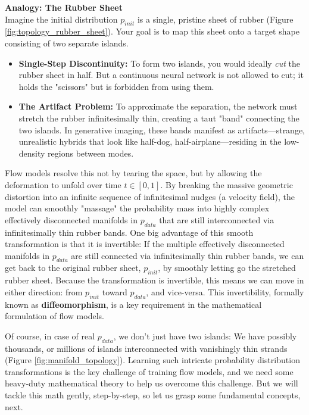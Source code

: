 \documentclass{book}
\begin{document}
\textbf{Analogy: The Rubber Sheet} \\
Imagine the initial distribution $p_{init}$ is a single, pristine sheet of rubber (Figure \ref{fig:topology_rubber_sheet}). Your goal is to map this sheet onto a target shape consisting of two separate islands.
\begin{itemize}
    \item \textbf{Single-Step Discontinuity:} To form two islands, you would ideally \textit{cut} the rubber sheet in half. But a continuous neural network is not allowed to cut; it holds the "scissors" but is forbidden from using them.
    \item \textbf{The Artifact Problem:} To approximate the separation, the network must stretch the rubber infinitesimally thin, creating a taut "band" connecting the two islands. In generative imaging, these bands manifest as artifacts—strange, unrealistic hybrids that look like half-dog, half-airplane—residing in the low-density regions between modes.
\end{itemize}

Flow models resolve this not by tearing the space, but by allowing the deformation to unfold over time $t \in [0, 1]$. By breaking the massive geometric distortion into an infinite sequence of infinitesimal nudges (a velocity field), the model can smoothly "massage" the probability mass into highly complex effectively disconnected manifolds in $p_{data}$ that are still interconnected via infinitesimally thin rubber bands. One big advantage of this smooth transformation is that it is invertible: If the multiple effectively disconnected manifolds in $p_{data}$ are still connected via infinitesimally thin rubber bands, we can get back to the original rubber sheet, $p_{init}$, by smoothly letting go the stretched rubber sheet. Because the transformation is invertible, this means we can move in either direction: from $p_{init}$ toward $p_{data}$, and vice-versa. This invertibility, formally known as \textbf{diffeomorphism}, is a key requirement in the mathematical formulation of flow models.

Of course, in case of real $p_{data}$, we don't just have two islands: We have possibly thousands, or millions of islands interconnected with vanishingly thin strands (Figure \ref{fig:manifold_topology}). Learning such intricate probability distribution transformations is the key challenge of training flow models, and we need some heavy-duty mathematical theory to help us overcome this challenge. But we will tackle this math gently, step-by-step, so let us grasp some fundamental concepts, next.
\end{document}
